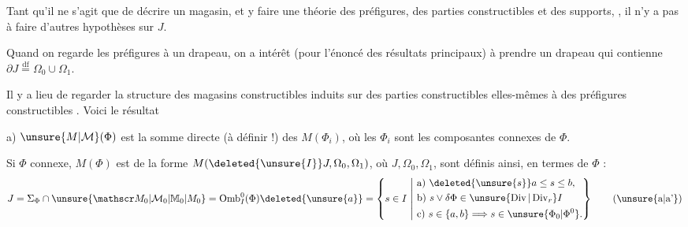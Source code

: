 
Tant qu'il ne s'agit que de décrire un magasin, et y faire une théorie des préfigures, des parties constructibles et des supports,  , il n'y a pas à faire d'autres hypothèses sur $J$.

Quand on regarde les préfigures  à un drapeau, on  a intérêt (pour l'énoncé des résultats principaux) à prendre un drapeau qui contienne $\partial J\overset{\mathrm{df}}=\Omega_0\cup\Omega_1$.

Il y a lieu de regarder la structure des magasins constructibles induits sur des parties constructibles  elles-mêmes à des préfigures constructibles \inserted{$\unsure{\Phi|\varphi}$}. Voici le résultat

a) $\unsure{M|\mathcal M}(\Phi)$ est la somme directe (à définir !) des $M(\Phi_i)$, où les $\Phi_i$ sont les composantes connexes de $\Phi$.

 Si $\Phi$  connexe,  $M(\Phi)$ est de la forme $M(\deleted{\unsure{I}}J,\Omega_0,\Omega_1)$, où $J,\Omega_0,\Omega_1$, sont définis ainsi, en termes de $\Phi$ :
\[
J=\Sigma_{\Phi}\cap\unsure{\mathscr M_0|\mathcal M_0|\mathbb M_0|M_0}
=\operatorname{Omb}^{0}_{I}(\Phi)\deleted{\unsure{a}}
=\left\{s\in I\ \middle|\
\begin{aligned}
&\text{a) }\deleted{\unsure{s}}a\leq s\leq b,\\
&\text{b) }s\vee\delta\Phi\in\unsure{\operatorname{Div}|\operatorname{Div}_{r}}I\\
&\text{c) }s\in\{a,b\}\Longrightarrow s\in\unsure{\Phi_0|\Phi^{0}}.
\end{aligned}\right\}
\tag*{(\unsure{a|a'})}
\]
